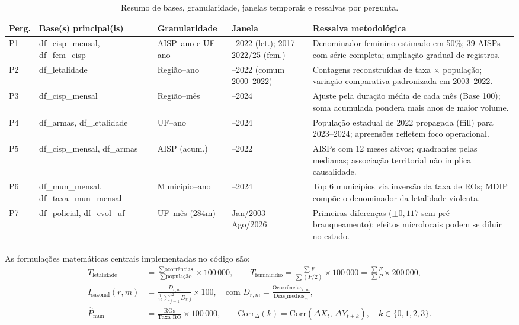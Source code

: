 \documentclass[11pt,a4paper]{article}
\newcommand{\code}[1]{{\ttfamily\footnotesize\allowbreak #1}}
\begin{document}
\begin{table}[!htbp]
\centering
\caption{Resumo de bases, granularidade, janelas temporais e ressalvas por pergunta.}
\label{tab:janelas}
{\footnotesize\begin{tabularx}{\linewidth}{>{\raggedright\arraybackslash}p{0.8cm} >{\raggedright\arraybackslash}p{3.0cm} >{\raggedright\arraybackslash}p{2.2cm} >{\raggedright\arraybackslash}p{2.3cm} >{\raggedright\arraybackslash}X}
\toprule
\textbf{Perg.} & \textbf{Base(s) principal(is)} & \textbf{Granularidade} & \textbf{Janela} & \textbf{Ressalva metodológica} \\
\midrule
P1 & \code{df\_cisp\_mensal}, \code{df\_fem\_cisp} & AISP--ano e UF--ano & 2003--2022 (let.); 2017--2022/25 (fem.) & Denominador feminino estimado em 50\%; 39 AISPs com série completa; ampliação gradual de registros. \\
P2 & \code{df\_letalidade} & Região--ano & 1991--2022 (comum 2000--2022) & Contagens reconstruídas de taxa $\times$ população; variação comparativa padronizada em 2003--2022. \\
P3 & \code{df\_cisp\_mensal} & Região--mês & 2003--2024 & Ajuste pela duração média de cada mês (Base 100); soma acumulada pondera mais anos de maior volume. \\
P4 & \code{df\_armas}, \code{df\_letalidade} & UF--ano & 2007--2024 & População estadual de 2022 propagada (\code{ffill}) para 2023--2024; apreensões refletem foco operacional. \\
P5 & \code{df\_cisp\_mensal}, \code{df\_armas} & AISP (acum.) & 2017--2022 & 39 AISPs com 12 meses ativos; quadrantes pelas medianas; associação territorial não implica causalidade. \\
P6 & \code{df\_mun\_mensal}, \code{df\_taxa\_mun\_mensal} & Município--ano & 2014--2024 & Top 6 municípios via inversão da taxa de ROs; MDIP compõe o denominador da letalidade violenta. \\
P7 & \code{df\_policial}, \code{df\_evol\_uf} & UF--mês (284m) & Jan/2003--Ago/2026 & Primeiras diferenças ($\pm 0{,}117$ sem pré-branqueamento); efeitos microlocais podem se diluir no estado. \\
\bottomrule
\end{tabularx}}
\end{table}

As formulações matemáticas centrais implementadas no código são:
\begin{align}
  T_{\text{letalidade}} &= \frac{\sum \text{ocorrências}}{\sum \text{população}} \times 100\,000, \qquad
  T_{\text{feminicídio}} = \frac{\sum F}{\sum (P / 2)} \times 100\,000 = \frac{\sum F}{\sum P} \times 200\,000, \\[4pt]
  I_{\text{sazonal}}(r, m) &= \frac{D_{r,m}}{\frac{1}{12}\sum_{j=1}^{12} D_{r,j}} \times 100, \quad \text{com } D_{r,m} = \frac{\text{Ocorrências}_{r,m}}{\text{Dias\_médios}_m}, \\[4pt]
  \widehat{P}_{\text{mun}} &= \frac{\text{ROs}}{\text{Taxa\_RO}} \times 100\,000, \qquad
  \text{Corr}_{\Delta}(k) = \text{Corr}(\Delta X_t,\, \Delta Y_{t+k}), \quad k \in \{0,1,2,3\}.
\end{align}
\end{document}
